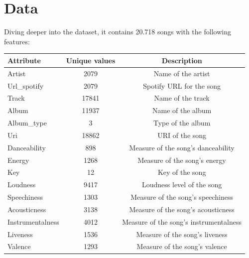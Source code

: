 \documentclass[11pt]{article} %
\begin{document}
\section{Data}

Diving deeper into the dataset, it contains 20.718 songs with the following features:

\begin{table}[H]
	\centering
	\begin{tabular}{lcc}
		\toprule
		\textbf{Attribute} & \textbf{Unique values} & \textbf{Description}                             \\
		\midrule
		Artist             & 2079                   & Name of the artist                               \\
		Url\_spotify       & 2079                   & Spotify URL for the song                         \\
		Track              & 17841                  & Name of the track                                \\
		Album              & 11937                  & Name of the album                                \\
		Album\_type        & 3                      & Type of the album                                \\
		Uri                & 18862                  & URI of the song                                  \\
		Danceability       & 898                    & Measure of the song's danceability               \\
		Energy             & 1268                   & Measure of the song's energy                     \\
		Key                & 12                     & Key of the song                                  \\
		Loudness           & 9417                   & Loudness level of the song                       \\
		Speechiness        & 1303                   & Measure of the song's speechiness                \\
		Acousticness       & 3138                   & Measure of the song's acousticness               \\
		Instrumentalness   & 4012                   & Measure of the song's instrumentalness           \\
		Liveness           & 1536                   & Measure of the song's liveness                   \\
		Valence            & 1293                   & Measure of the song's valence                    \\

\end{tabular}
\end{table}
\end{document}
